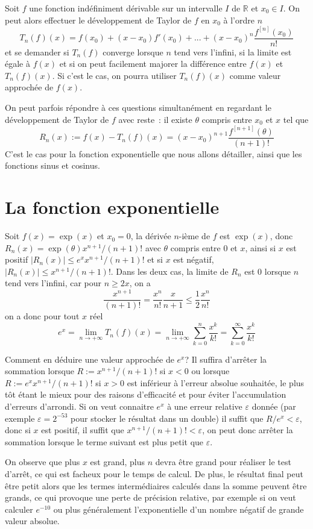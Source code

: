 \documentclass[a4paper,11pt]{book}
\begin{document}
\begin{giacjshere}
Soit $f$ une fonction indéfiniment dérivable sur un intervalle $I$ de $\mathbb{R}$
et $x_0 \in I$. On peut alors effectuer le développement de Taylor de $f$
en $x_0$ à l'ordre $n$
\[ T_n(f)(x)= f(x_0) + (x-x_0) f'(x_0) + ... + 
(x-x_0)^n \frac{f^{[n]}(x_0)}{n!} \]
et se demander si $T_n(f)$ converge lorsque $n$ tend vers
l'infini, si la limite est égale à $f(x)$ et si on peut facilement
majorer la différence entre $f(x)$ et $T_n(f)(x)$. Si c'est le
cas, on pourra utiliser $T_n(f)(x)$ comme valeur approchée de $f(x)$.

On peut parfois répondre à ces questions simultanément en regardant le
développement de Taylor de $f$ avec reste~: il existe $\theta$ compris
entre $x_0$ et $x$ tel que
\[ R_n(x) := f(x)- T_n(f)(x) = (x-x_0)^{n+1}\frac{f^{[n+1]}(\theta)}{(n+1)!} \]
C'est le cas pour la fonction exponentielle que nous allons
détailler, ainsi que les fonctions sinus et cosinus.

\section{La fonction exponentielle}
Soit $f(x)=\exp(x)$ et $x_0=0$, la dérivée $n$-ième de $f$ 
est $\exp(x)$, donc $R_n(x)=\exp(\theta)x^{n+1}/(n+1)!$ avec $\theta$
compris entre 0 et $x$, ainsi si $x$ est positif 
$|R_n(x)| \leq e^x x^{n+1}/(n+1)!$ et si $x$ est négatif,
$|R_n(x)| \leq x^{n+1}/(n+1)!$. Dans les deux cas, la limite de $R_n$
est 0 lorsque $n$ tend vers l'infini, car pour $n \geq 2x$, on a
\[ \frac{x^{n+1}}{(n+1)!} = \frac{x^n}{n!} \frac{x}{n+1}\leq 
\frac{1}{2}\frac{x^n}{n!}\]
on a donc pour tout $x$ réel
\[ e^x = \lim_{n \rightarrow +\infty} T_n(f)(x)
= \lim_{n \rightarrow +\infty} \sum_{k=0}^n \frac{x^k}{k!}
= \sum_{k=0}^\infty \frac{x^k}{k!} \]

Comment en déduire une valeur approchée de $e^x$? Il suffira d'arr\^eter
la sommation lorsque $R:=x^{n+1}/(n+1)!$ si $x<0$ ou lorsque
$R:=e^x x^{n+1}/(n+1)!$ si $x>0$ est inférieur à 
l'erreur absolue souhaitée, le plus tôt étant le mieux pour des
raisons d'efficacité et pour éviter l'accumulation d'erreurs
d'arrondi. 
Si on veut connaitre $e^x$ à une erreur relative $\varepsilon$ donnée
(par exemple $\varepsilon=2^{-53}$ pour stocker le résultat dans un double)
il suffit que $R/e^x < \varepsilon$, donc si $x$ est positif, il suffit
que $x^{n+1}/(n+1)!<\varepsilon$, on peut donc arrêter la sommation
lorsque le terme suivant est plus petit que $\varepsilon$.

On observe que plus $x$ est grand, plus $n$ devra
être grand pour réaliser le test d'arrêt, ce qui est facheux
pour le temps de calcul.
De plus, le résultat final peut être petit alors que les termes
intermédiaires calculés dans la somme peuvent être grands, ce qui
provoque une perte de précision relative, par exemple si on
veut calculer $e^{-10}$ ou plus généralement l'exponentielle
d'un nombre négatif de grande valeur absolue.


\end{giacjshere}
\end{document}
